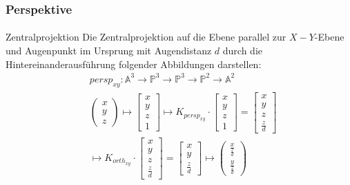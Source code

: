 \documentclass{beamer}
\begin{document}
\begin{frame}
    \frametitle{Perspektive}
\framesubtitle{}
\begin{block}{Zentralprojektion}
Die Zentralprojektion auf die Ebene parallel zur $X-Y$-Ebene und Augenpunkt im Ursprung mit Augendistanz $d$ durch die Hintereinanderausführung folgender Abbildungen darstellen:
\begin{align*}
& persp_{xy} :\mathbb{A}^3   \to \mathbb{P}^3    \to  \mathbb{P}^3    \to \mathbb{P}^2    \to \mathbb{A}^2  \\
&\begin{pmatrix} x \\ y \\ z \end{pmatrix} \mapsto \begin{bmatrix} x \\ y \\ z \\ 1 \end{bmatrix}   \mapsto K_{persp_{xy}} \cdot  \begin{bmatrix} x \\ y \\ z \\ 1 \end{bmatrix} =   \begin{bmatrix} x \\ y \\ z \\ \frac{z}{d}  \end{bmatrix} \\
 & \mapsto K_{orth_{xy}} \cdot   \begin{bmatrix} x \\ y \\ z \\ \frac{z}{d}  \end{bmatrix}=   \begin{bmatrix} x \\ y \\ \frac{z}{d} \end{bmatrix}   \mapsto 
 \begin{pmatrix}  \frac{x}{\frac{z}{d} } \\   \frac{y}{\frac{z}{d} } \end{pmatrix}
 \end{align*}

\end{block}
\end{frame}
\end{document}
